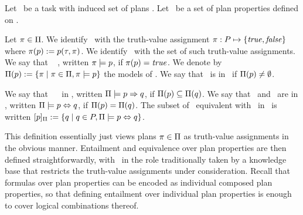\begin{definition}[Entailment]
Let \task\ be a task with induced set of plans \plans. Let \props\ be
a set of plan properties defined on \task.

Let $\pi \in \Pi$. We identify \plan\ with the truth-value
assignment $\pi : P \mapsto \{\mathit{true}, \mathit{false}\}$ where
$\pi(p) := p(\tau,\pi)$. We identify \plans\ with the set
of such truth-value assignments. We say that
\plan\  \prop, written $\pi \models p$, if
$\pi(p) = \mathit{true}$. We denote by $\Pi(p) :=
\{\pi \mid \pi \in \Pi, \pi \models p\}$ the models of
\prop. We say that \prop\ is  in \plans\ if
$\Pi(p) \neq \emptyset$.

We say that \prop\  \propq\ in \plans, written
$\Pi \models p \Rightarrow q$, if $\Pi(p)
\subseteq \Pi(q)$.
%
We say that \prop\ and \propq\ are  in \plans,
written $\Pi \models p \Leftrightarrow q$, if $\Pi(p) =
\Pi(q)$. The subset of \props\ equivalent with
\prop\ in \plans\ is written $[p]_{\Pi} := \{q \mid
q \in P, \Pi \models p \Leftrightarrow q\}$.
\end{definition}

This definition essentially just views plans $\pi \in \Pi$ as
truth-value assignments in the obvious manner. Entailment and
equivalence over plan properties are then defined straightforwardly,
with \plans\ in the role traditionally taken by a knowledge base that
restricts the truth-value assignments under consideration. Recall that
formulas over plan properties can be encoded as individual composed
plan properties, so that defining entailment over individual plan
properties is enough to cover logical combinations thereof.

